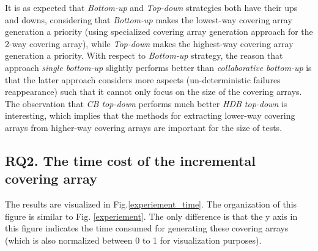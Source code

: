 \documentclass[conference]{IEEEtran}
\theoremstyle{definition}
\begin{document}
It is as expected that \emph{Bottom-up} and \emph{Top-down} strategies both have their ups and downs, considering that \emph{Bottom-up} makes the lowest-way covering array generation a priority (using specialized covering array generation approach for the 2-way covering array), while \emph{Top-down} makes the highest-way covering array generation a priority.  With respect to \emph{Bottom-up} strategy, the reason that approach \emph{single bottom-up} slightly performs better than \emph{collaborative bottom-up} is that the latter approach considers more aspects (un-deterministic failures reappearance) such that it cannot only focus on the size of the covering arrays.  The observation that \emph{CB top-down} performs much better \emph{HDB top-down} is interesting, which implies that the methods for extracting lower-way  covering arrays from higher-way covering arrays are important for the size of tests.


\subsection{RQ2. The time cost of the incremental covering array}

The results are visualized in Fig.\ref{experiement_time}. The organization of this figure is similar to Fig. \ref{experiement}. The only difference is that the y axis in this figure indicates the time consumed for generating these covering arrays (which is also normalized between 0 to 1 for visualization purposes).

\end{document}
